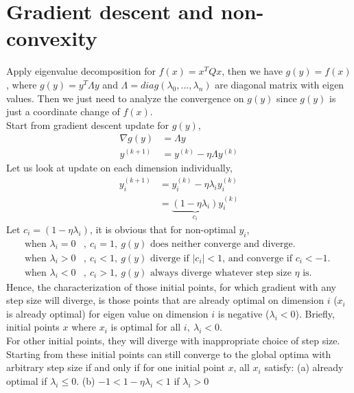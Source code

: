 \documentclass[11pt,a4paper]{article}
\begin{document}
\newpage
\section{Gradient descent and non-convexity}
Apply eigenvalue decomposition for $f(x) = x^T Q x$, then we have $g(y) =
f(x)$, where $g(y) = y^T \Lambda y$ and $\Lambda = diag(\lambda_0, ...,\lambda_n)$
are diagonal matrix with eigen values. Then we just need to analyze the
convergence on $g(y)$ since $g(y)$ is just a coordinate change of $f(x)$. \\
Start from gradient descent update for $g(y)$,
\begin{align}
    \nabla g(y) &= \Lambda y \\
    y^{(k+1)} &= y^{(k)} - \eta \Lambda y^{(k)}
\end{align}
Let us look at update on each dimension individually, 
\begin{align}
    y^{(k+1)}_i &= y^{(k)}_i - \eta \lambda_i y_i^{(k)} \\
    &= \underbrace{(1 - \eta \lambda_i)}_{c_i} y_i^{(k)}
\end{align}
Let $c_i = (1 - \eta \lambda_i)$, it is obvious that for non-optimal $y_i$, 
\begin{align}
    \text{when } \lambda_i = 0&,\ c_i = 1,\ g(y) \text{ does neither converge and diverge. } \\
    \text{when } \lambda_i > 0&,\ c_i < 1,\ g(y) \text{ diverge if $|c_i| < 1$, and converge 
    if $c_i < -1$. } \\
   \text{when } \lambda_i < 0&,\ c_i > 1,\ g(y) \text{ always diverge whatever
       step size $\eta$ is. }
\end{align}
Hence, the characterization of those initial points, for which gradient with
any step size will diverge, is those points that are already optimal on
dimension $i$ ($x_i$ is already optimal) for eigen value on dimension $i$ is
negative ($\lambda_i < 0$). 
Briefly, initial points $x$ where $x_i$ is optimal for all $i,\ \lambda_i <
0$. \\
For other initial points, they will diverge with inappropriate choice of step size.
Starting from these initial points can still converge to the global optima
with arbitrary step size if and only if for one initial point $x$, all $x_i$
satisfy: 
(a) already optimal if $\lambda_i \leq 0$. 
(b) $-1 < 1-\eta \lambda_i < 1$ if $\lambda_i > 0$

\newpage
\end{document}
